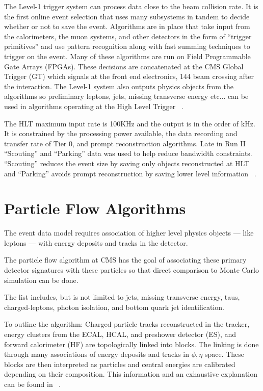 The Level-1 trigger system can process data close to the beam collision rate. It is the first online event selection that uses many subsystems in tandem to decide whether or not to save the event. Algorithms are in place that take input from the calorimeters, the muon systems, and other detectors in the form of ``trigger primitives'' and use pattern recognition along with fast summing techniques to trigger on the event. Many of these algorithms are run on Field Programmable Gate Arrays (FPGAs). These decisions are concatenated at the CMS Global Trigger (GT) which signals at the front end electronics, 144 beam crossing after the interaction. The Level-1 system also outputs physics objects from the algorithms so preliminary leptons, jets, missing transverse energy etc... can be used in algorithms operating at the High Level Trigger ~\cite{Foudas:2232067}. 


The HLT maximum input rate is 100KHz and the output is in the order of kHz. It is constrained by the processing power available, the data recording and transfer rate of Tier 0, and prompt reconstruction algorithms. Late in Run II  ``Scouting'' and ``Parking'' data was used to help reduce bandwidth constraints. ``Scouting'' reduces the event size by saving only objects reconstructed at HLT and ``Parking'' avoids prompt reconstruction by saving lower level information ~\cite{Thomas:2703017}.


\section{Particle Flow Algorithms}
The event data model requires association of higher level physics objects --- like leptons --- with energy deposits and tracks in the detector. 

The particle flow algorithm at CMS has the goal of associating these primary detector signatures with these particles so that direct comparison to Monte Carlo simulation can be done. 

The list includes, but is not limited to jets, missing transverse energy, taus, charged-leptons, photon isolation, and bottom quark jet identification.


To outline the algorithm: Charged particle tracks reconstructed in the tracker, energy clusters from the ECAL, HCAL, and preshower detector (ES), and forward calorimeter (HF) are topologically linked into blocks. The linking is done through many associations of energy deposits and tracks in $\phi,\eta$ space. These blocks are then interpreted as particles and central energies are calibrated depending on their composition. This information and an exhaustive explanation can be found in ~\cite{CMS-PAS-PFT-10-001}.

